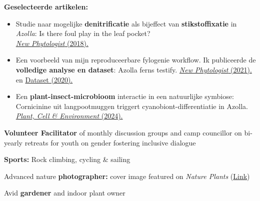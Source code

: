 \documentclass[a4paper,10pt]{article}
\begin{document}
\noindent \textbf{Geselecteerde artikelen:}
\begin{itemize}
  \setlength{\itemsep}{0em}

  \item Studie naar mogelijke \textbf{denitrificatie} als bijeffect van \textbf{stikstoffixatie} in \emph{Azolla}: 
    Is there foul play in the leaf pocket? \\
    {\null\hfill\footnotesize\href{https://doi.org/10.1111/nph.14843}{\emph{New Phytologist} (2018).}}

  \item Een voorbeeld van mijn reproduceerbare fylogenie workflow. Ik publiceerde de \textbf{volledige analyse en dataset}: Azolla ferns testify. 
    {\null\hfill\footnotesize \href{https://doi.org/10.1111/nph.16896}{\emph{New Phytologist} (2021).}  en
    \href{https://doi.org/10.5281/zenodo.3959057}{Dataset (2020).}}

  \item Een \textbf{plant-insect-microbioom} interactie in een natuurlijke symbiose: Cornicinine uit langpootmuggen triggert cyanobiont-differentiatie in Azolla.
    {\null\hfill\footnotesize\href{https://doi.org/10.1111/pce.14907}{\emph{Plant, Cell \& Environment} (2024).} }
\end{itemize}

\vfill

\begin{description}
  \raggedright
  \item \textbf{Volunteer Facilitator} of monthly discussion groups and camp councillor on bi-yearly retreats for youth on gender fostering inclusive dialogue
  \item \textbf{Sports:} Rock climbing, cycling \& sailing
  \item Advanced nature \textbf{photographer:} cover image featured on \emph{Nature Plants} (\href{https://lauralwd.github.io/photography/}{Link})
  \item Avid \textbf{gardener} and indoor plant owner
\end{description}

\vfill
\end{document}
